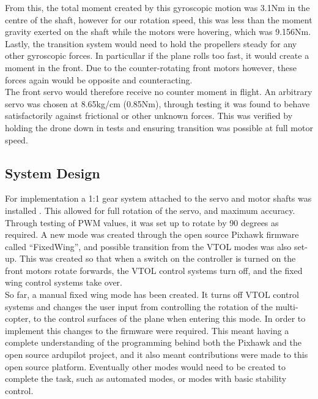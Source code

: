 From this, the total moment created by this gyroscopic motion was 3.1Nm in the centre of the shaft, however for our rotation speed, this was less than the moment gravity exerted on the shaft while the motors were hovering, which was 9.156Nm. Lastly, the transition system would need to hold the propellers steady for any other gyroscopic forces. In particullar if the plane rolls too fast, it would create a moment in the front. Due to the counter-rotating front motors however, these forces again would be opposite and counteracting.\\

The front servo would therefore receive no counter moment in flight. An arbitrary servo was chosen at 8.65kg/cm (0.85Nm), through testing it was found to behave satisfactorily against frictional or other unknown forces. This was verified by holding the drone down in tests and ensuring transition was possible at full motor speed.

\subsection{System Design}
For implementation a 1:1 gear system attached to the servo and motor shafts was installed . This allowed for full rotation of the servo, and maximum accuracy.  Through testing of PWM values, it was set up to rotate by 90 degrees as required. A new mode was created through the open source Pixhawk firmware called “FixedWing”, and possible transition from the VTOL modes was also set-up. This was created so that when a switch on the controller is turned on the front motors rotate forwards, the VTOL control systems turn off, and the fixed wing control systems take over.\\

So far, a manual fixed wing mode has been created. It turns off VTOL control systems and changes the user input from controlling the rotation of the multi-copter, to the control surfaces of the plane when entering this mode. In order to implement this changes to the firmware were required.  This meant having  a complete understanding of the programming behind both the Pixhawk and the open source ardupilot project, and it also meant contributions were made to this open source platform. Eventually other modes would need to be created to complete the task, such as automated modes, or modes with basic stability control. \\

